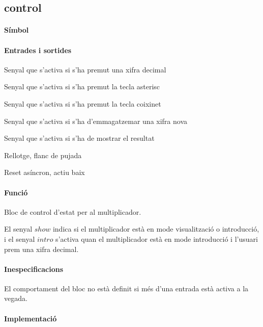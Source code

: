\subsection{\label{sub:\projectname-control} \textsf{control}}

\paragraph{Símbol}

\begin{center}  \end{center}

\paragraph{Entrades i sortides}

\begin{where}
\item[\nodenamebit{bcd}] Senyal que s'activa si s'ha premut una xifra decimal
\item[\nodenamebit{ast}] Senyal que s'activa si s'ha premut la tecla asterisc
\item[\nodenamebit{coi}] Senyal que s'activa si s'ha premut la tecla coixinet
\item[\nodenamebit{intro}] Senyal que s'activa si s'ha d'emmagatzemar una xifra nova
\item[\nodenamebit{show}] Senyal que s'activa si s'ha de mostrar el resultat
\item[\nodenamebit{clk}] Rellotge, flanc de pujada
\item[\nodenamebit{nrst}] Reset asíncron, actiu baix
\end{where}

\paragraph{Funció}

Bloc de control d'estat per al multiplicador.

El senyal $show$ indica si el multiplicador està en mode visualització o introducció,
i el senyal $intro$ s'activa quan el multiplicador està en mode introducció i l'usuari
prem una xifra decimal.

\paragraph{Inespecificacions}


El comportament del bloc no està definit si més d'una entrada està activa a la vegada.


\paragraph{Implementació}





\vspace{1cm}
